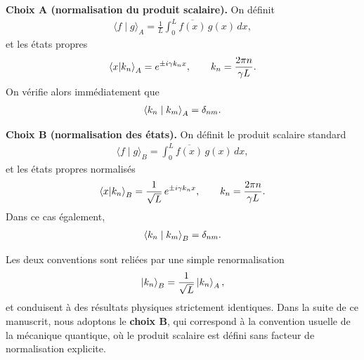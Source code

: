 \medskip
\noindent
\textbf{Choix A (normalisation du produit scalaire).}
On définit
\begin{eqnarray}
   \langle f\mid g\rangle_A
   =
    \frac{1}{L}\int_0^L \overline{f(x)}\,g(x)\,dx,
\end{eqnarray}
et les états propres
\begin{eqnarray}
   \braket{x \vert k_n}_A=e^{\pm i\gamma k_n x},
\qquad
k_n=\frac{2\pi n}{\gamma L}.
\end{eqnarray}
On vérifie alors immédiatement que
\begin{eqnarray}
   \braket{k_n\mid k_m}_A=\delta_{nm}.
\end{eqnarray}

\medskip
\noindent
\textbf{Choix B (normalisation des états).}
On définit le produit scalaire standard
\begin{eqnarray}
   \langle f\mid g\rangle_B
=
\int_0^L \overline{f(x)}\,g(x)\,dx,
\end{eqnarray}
et les états propres normalisés
\begin{eqnarray}
   \braket{ x \vert k_n}_B=\frac{1}{\sqrt{L}}\,e^{\pm i\gamma k_n x},
\qquad
k_n=\frac{2\pi n}{\gamma L}.
\end{eqnarray}
Dans ce cas également,
\begin{eqnarray}
   \braket{k_n\mid k_m}_B=\delta_{nm}.
\end{eqnarray}


\medskip
Les deux conventions sont reliées par une simple renormalisation
\begin{eqnarray}
   \ket{k_n}_B=\frac{1}{\sqrt{L}}\ket{k_n}_A,
\end{eqnarray}
et conduisent à des résultats physiques strictement identiques.
Dans la suite de ce manuscrit, nous adoptons le \textbf{choix B}, qui correspond
à la convention usuelle de la mécanique quantique, où le produit scalaire est
défini sans facteur de normalisation explicite.\\


